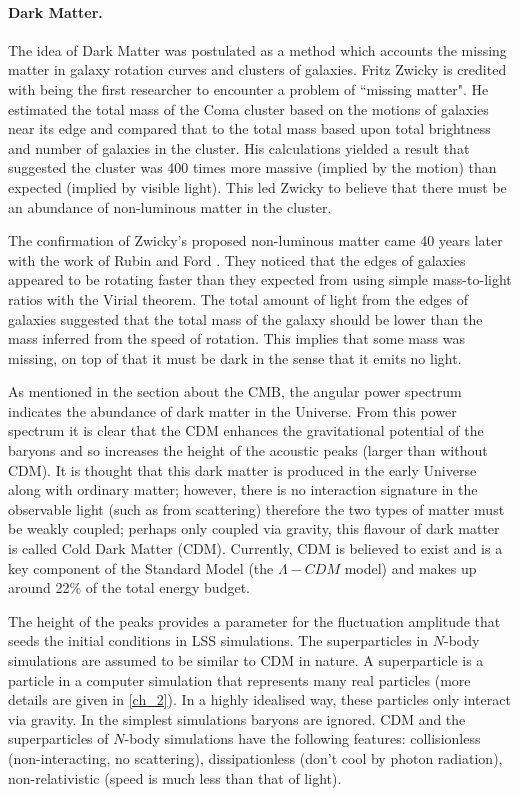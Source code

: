 \paragraph{Dark Matter.}
The idea of Dark Matter was postulated as a method which accounts the missing matter in galaxy rotation curves and clusters of galaxies. Fritz Zwicky \citep{bib_zwi} is credited with being the first researcher to encounter a problem of ``missing matter". He estimated the total mass of the Coma cluster based on the motions of galaxies near its edge and compared that to the total mass based upon total brightness and number of galaxies in the cluster. His calculations yielded a result that suggested the cluster was 400 times more massive (implied by the motion) than expected (implied by visible light). This led Zwicky to believe that there must be an abundance of non-luminous matter in the cluster.

The confirmation of Zwicky's proposed non-luminous matter came 40 years later with the work of Rubin and Ford \citep{bib_rub}. They noticed that the edges of galaxies appeared to be rotating faster than they expected from using simple mass-to-light ratios with the Virial theorem. The total amount of light from the edges of galaxies suggested that the total mass of the galaxy should be lower than the mass inferred from the speed of rotation. This implies that some mass was missing, on top of that it must be dark in the sense that it emits no light.

As mentioned in the section about the CMB, the angular power spectrum indicates the abundance of dark matter in the Universe. From this power spectrum it is clear that the CDM enhances the gravitational potential of the baryons and so increases the height of the acoustic peaks (larger than without CDM). It is thought that this dark matter is produced in the early Universe along with ordinary matter; however, there is no interaction signature in the observable light (such as from scattering) therefore the two types of matter must be weakly coupled; perhaps only coupled via gravity, this flavour of dark matter is called Cold Dark Matter (CDM). Currently, CDM is believed to exist and is a key component of the Standard Model (the $\Lambda-CDM$ model) and makes up around 22\% of the total energy budget. \citep{bib_wmap}

The height of the peaks provides a parameter for the fluctuation amplitude that seeds the initial conditions in LSS simulations. The superparticles in $N$-body simulations are assumed to be similar to CDM in nature. A superparticle is a particle in a computer simulation that represents many real particles (more details are given in \ref{ch_2}). In a highly idealised way, these particles only interact via gravity. In the simplest simulations baryons are ignored. CDM and the superparticles of $N$-body simulations have the following features: collisionless (non-interacting, no scattering), dissipationless (don't cool by photon radiation), non-relativistic (speed is much less than that of light).

